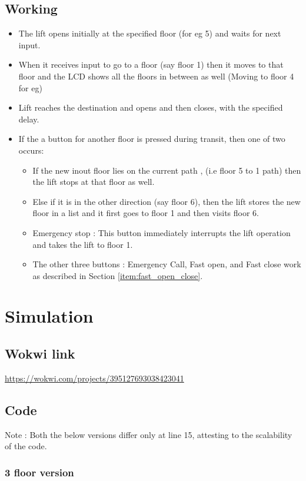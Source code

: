 \documentclass{article}
\begin{document}
\subsection {Working}
\begin{itemize}
\item The lift opens initially at the specified floor (for eg 5) and waits for next input.
\item When it receives input to go to a floor (say floor 1) then it moves to that floor and the LCD shows all the floors in between as well (Moving to floor 4 for eg)
\item  Lift reaches the destination and opens and then closes, with the  specified delay.

\item If the a button for another floor is pressed during transit, then one of two occurs:
\begin{itemize}
\item If the new inout floor lies on the current path , (i.e floor 5 to 1 path) then the lift stops at that floor as well. 
\item Else if it is in the other direction (say floor 6), then the lift 
stores the new floor in a list and it first goes to floor 1 and then visits floor 6.
\item Emergency stop : This button immediately interrupts the lift operation and takes the lift to floor 1.
\item  The other three buttons : Emergency Call, Fast open, and Fast close work as described in Section \ref{item:fast_open_close}.
\end{itemize}
\end{itemize}

\section{Simulation }

\subsection{Wokwi link}
 \url{https://wokwi.com/projects/395127693038423041}
\subsection{Code}
Note : Both the below versions differ only at line 15, attesting to the scalability of the code.
\subsubsection{3 floor version}

\clearpage
\end{document}
